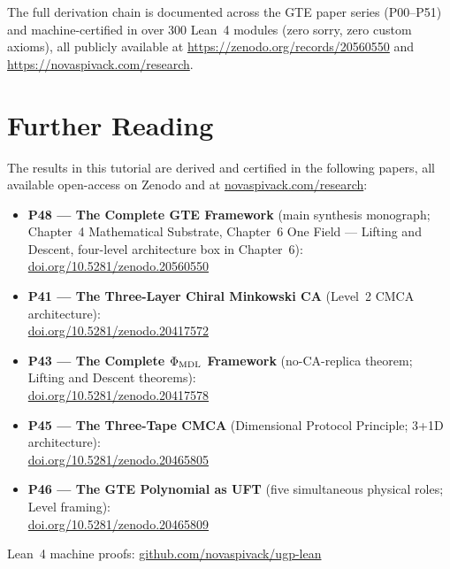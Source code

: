 \documentclass[11pt,a4paper]{article}
\begin{document}
\bigskip\noindent
The full derivation chain is documented across the GTE paper series (P00--P51)
and machine-certified in over 300 Lean~4 modules (zero sorry, zero custom
axioms), all publicly available at \url{https://zenodo.org/records/20560550}
and \url{https://novaspivack.com/research}.

\section*{Further Reading}
\begin{tcolorbox}[colback=orange!8,colframe=orange!50!black,
  title=\textbf{Primary Sources}]
The results in this tutorial are derived and certified in the following
papers, all available open-access on Zenodo and at
\href{https://novaspivack.com/research}{novaspivack.com/research}:
\begin{itemize}[itemsep=4pt]
  \item \textbf{P48 --- The Complete GTE Framework} (main synthesis monograph;
    Chapter~4 Mathematical Substrate, Chapter~6 One Field --- Lifting and
    Descent, four-level architecture box in Chapter~6):\\
    \href{https://doi.org/10.5281/zenodo.20560550}{doi.org/10.5281/zenodo.20560550}
  \item \textbf{P41 --- The Three-Layer Chiral Minkowski CA} (Level~2 CMCA
    architecture):\\
    \href{https://doi.org/10.5281/zenodo.20417572}{doi.org/10.5281/zenodo.20417572}
  \item \textbf{P43 --- The Complete $\Phi_{\rm MDL}$ Framework} (no-CA-replica
    theorem; Lifting and Descent theorems):\\
    \href{https://doi.org/10.5281/zenodo.20417578}{doi.org/10.5281/zenodo.20417578}
  \item \textbf{P45 --- The Three-Tape CMCA} (Dimensional Protocol Principle;
    3+1D architecture):\\
    \href{https://doi.org/10.5281/zenodo.20465805}{doi.org/10.5281/zenodo.20465805}
  \item \textbf{P46 --- The GTE Polynomial as UFT} (five simultaneous physical
    roles; Level framing):\\
    \href{https://doi.org/10.5281/zenodo.20465809}{doi.org/10.5281/zenodo.20465809}
\end{itemize}
Lean~4 machine proofs:
\href{https://github.com/novaspivack/ugp-lean}{github.com/novaspivack/ugp-lean}
\end{tcolorbox}


\end{document}

